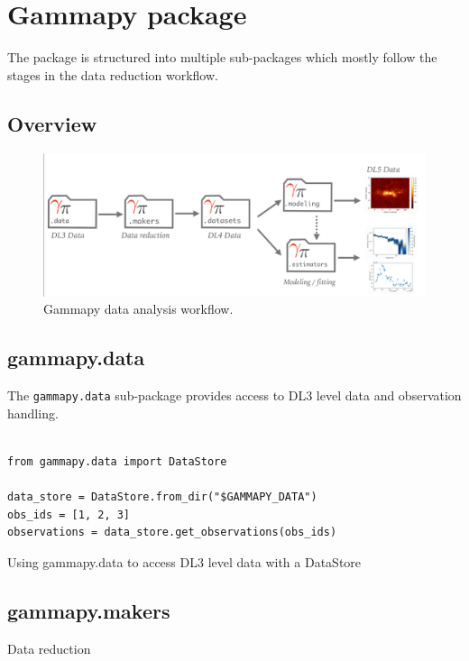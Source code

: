 \section{Gammapy package}
\label{sec:package}

The \gammapy package is structured into multiple sub-packages
which mostly follow the stages in the data reduction workflow.


\subsection{Overview}
\begin{figure}[t]
\centering
\includegraphics[width=1.\textwidth]{figures/workflow}
\caption{
Gammapy data analysis workflow.
}
\label{fig:workflow}
\end{figure}



\subsection{gammapy.data}
The \verb|gammapy.data| sub-package provides access to
DL3 level data and observation handling.


\begin{listing}
\begin{verbatim}

from gammapy.data import DataStore

data_store = DataStore.from_dir("$GAMMAPY_DATA")
obs_ids = [1, 2, 3]
observations = data_store.get_observations(obs_ids)

\end{verbatim}
\caption{Using gammapy.data to access DL3 level data with a DataStore}
\label{codeexample:data}
\end{listing}



\subsection{gammapy.makers}
Data reduction

